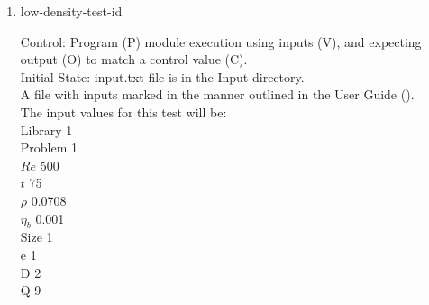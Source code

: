 \documentclass[12pt, titlepage]{article}
\newcommand{\famname}{Lattice Boltzmann Solver}
\newcounter{testcounter} %
\begin{document}
\begin{enumerate}
Output: Vorticity vector values printed to the screen. \\

Test Case Derivation: This case is a comparison with the pseudo-oracle
pyLBM. The C values of this test for pyLBM can be found in the file
id6output.txt located in the OracleOutput folder. The output values of {\famname} will be compared to the pseudo-oracle output values.

This test covers a very large Reynolds number representing very turbulent flow.\\	
					
How test will be performed: 

\begin{enumerate}
\item The Von Karman Vortex Street module shall be modified by the author to
  print the vorticity vector as output.
\item Outside of the system, the input parameter values will be written to a text file titled input.txt, as outlined in Section \ref{ext4-inputs} of the User Guide.
\item The file will be placed into the Input directory, under the home directory of the project.
\item {\famname} shall be run.
\item Upon completion of the module, the output values of the vorticity vector
  will be compared to the vorticity vector values from pyLBM - comparison will
  be done per cell. Comparisons can be done manually using Excel, or through a
  script, using the equation for relative error found in Section \ref{eqerror}.
\end{enumerate}

\item{low-density-test-id\thetestcounter \\}

Control: Program (P) module execution using inputs (V), and expecting output (O)
to match a control value (C).\\
					
Initial State: input.txt file is in the Input directory.\\
					
A file with inputs marked in the manner outlined in the User
Guide (\citet{LBM_UserGuide_PM}).\\The input values for this test will be:\\
Library 1\\
Problem 1\\
$Re$ 500\\
$t$ 75\\
$\rho$ 0.0708\\
$\eta_b$ 0.001\\
Size 1\\
$\mathrm{e}$ 1\\
$\mathrm{D}$ 2\\
$\mathrm{Q}$ 9\\


\end{enumerate}
\end{document}
